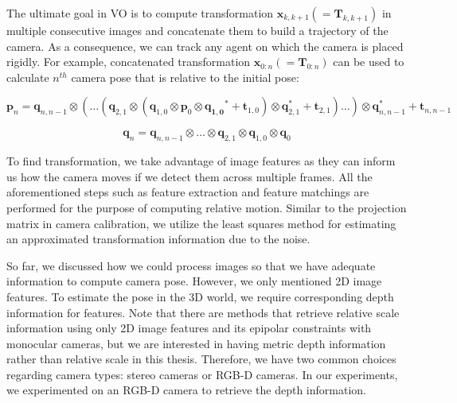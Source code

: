 \documentclass[12pt]{report}
\numberwithin{figure}{section}
\begin{document}
The ultimate goal in VO is to compute transformation 
$\mathbf{x}_{k,k+1}(=\mathbf{T}_{k,k+1})$ in 
multiple consecutive images and concatenate them to build a trajectory of the 
camera. As a consequence, we can track any agent on which the camera is placed 
rigidly. For example, concatenated transformation 
$\mathbf{x}_{0:n}(=\mathbf{T}_{0:n})$ can be 
used to calculate $n^{th}$ camera pose that is relative to the initial pose:

\begin{equation}
  \mathbf{p}_{n} = 
  \mathbf{q}_{n, n-1} \otimes (\dots
  (\mathbf{q}_{2,1} \otimes
  (\mathbf{q}_{1,0} \otimes \mathbf{p}_0 \otimes \mathbf{q_{1,0}}^* + \mathbf{t}_{1,0})
  \otimes \mathbf{q}_{2,1}^* + \mathbf{t}_{2,1})
  \dots) \otimes \mathbf{q}_{n, n-1}^* +\mathbf{t}_{n, n-1} 
\end{equation}

\begin{equation}
  \mathbf{q}_{n} = 
  \mathbf{q}_{n,n-1} \otimes \dots \otimes \mathbf{q}_{2,1} \otimes \mathbf{q}_{1,0} \otimes \mathbf{q}_{0} 
\end{equation}

To find transformation, we take advantage of image features as they can inform 
us how the camera moves if we detect them across multiple frames.  All the 
aforementioned steps such as feature extraction and feature matchings are 
performed for the purpose of computing relative motion. Similar to the 
projection 
matrix in camera calibration, we utilize the least squares 
method for estimating an approximated transformation information due to the 
noise. 


So far, we discussed how we could process images so that we have adequate 
information to compute camera pose. However, we only mentioned 2D image 
features. To estimate the pose in the 3D world, we require corresponding depth 
information for features. Note that there are methods that retrieve relative 
scale information using only 2D image features and its epipolar constraints 
with monocular cameras, but we are interested in having metric depth 
information rather than relative scale in this thesis. Therefore, we have two 
common choices regarding camera types: stereo cameras or RGB-D cameras. In our 
experiments, we experimented on an RGB-D camera to retrieve the depth 
information.
\end{document}
